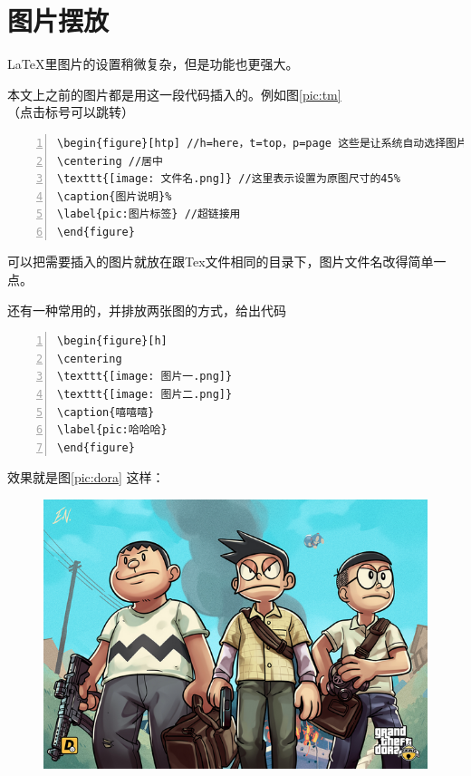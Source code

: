 \documentclass[12pt,a4paper,oneside]{book}
\begin{document}
{\section{图片摆放}
\LaTeX 里图片的设置稍微复杂，但是功能也更强大。
\par
本文上之前的图片都是用这一段代码插入的。例如图\ref{pic:tm}（点击标号可以跳转）
\par
\begin{lstlisting}[language={[ANSI]C}, numbers=left, numberstyle=\tiny, keywordstyle=\color{blue!70},  frame=shadowbox, rulesepcolor=\color{red!20!green!20!blue!20}]
\begin{figure}[htp] //h=here，t=top，p=page 这些是让系统自动选择图片最合适的位置
\centering //居中
\texttt{[image: 文件名.png]} //这里表示设置为原图尺寸的45%
\caption{图片说明}% 
\label{pic:图片标签} //超链接用
\end{figure}
\end{lstlisting}
\par
可以把需要插入的图片就放在跟Tex文件相同的目录下，图片文件名改得简单一点。
\par
还有一种常用的，并排放两张图的方式，给出代码~
\par
\begin{lstlisting}[language={[ANSI]C}, numbers=left, numberstyle=\tiny, keywordstyle=\color{blue!70},  frame=shadowbox, rulesepcolor=\color{red!20!green!20!blue!20}]
\begin{figure}[h]
\centering
\texttt{[image: 图片一.png]}
\texttt{[image: 图片二.png]}
\caption{嘻嘻嘻}
\label{pic:哈哈哈}
\end{figure}
\end{lstlisting}
\par
效果就是图\ref{pic:dora} 这样：
\par
\begin{figure}[h]
\centering
\includegraphics[scale=0.21]{Figures/tr.png}

\end{figure}}
\end{document}
